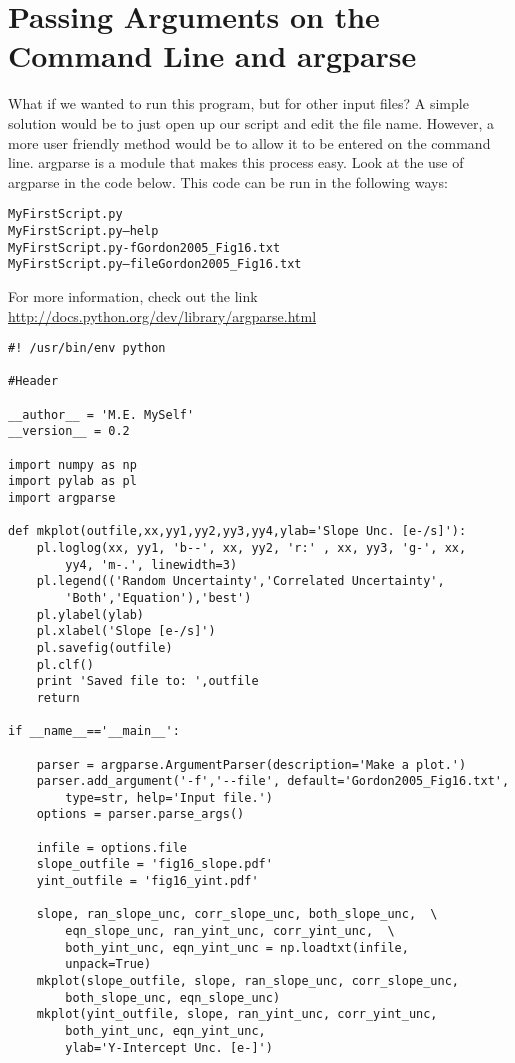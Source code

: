 \section{Passing Arguments on the Command Line and {\sf argparse}}
What if we wanted to run this program, but for other input files?  A
simple solution would be to just open up our script and edit the file
name.  However, a more user friendly method would be to allow it to be
entered on the command line.  {\sf\small argparse} is a module that
makes this process easy.  Look at the use of {\sf\small
  argparse} in the code below.  This code can be run in the following
ways:
\begin{alltt}
\termtab MyFirstScript.py 
\termtab MyFirstScript.py --help
\termtab MyFirstScript.py -f Gordon2005_Fig16.txt
\termtab MyFirstScript.py --file Gordon2005_Fig16.txt
\end{alltt}
For more information, check out the link
\url{http://docs.python.org/dev/library/argparse.html}

\begin{verbatim}
#! /usr/bin/env python

#Header

__author__ = 'M.E. MySelf'
__version__ = 0.2

import numpy as np
import pylab as pl
import argparse

def mkplot(outfile,xx,yy1,yy2,yy3,yy4,ylab='Slope Unc. [e-/s]'):
    pl.loglog(xx, yy1, 'b--', xx, yy2, 'r:' , xx, yy3, 'g-', xx,  
        yy4, 'm-.', linewidth=3) 
    pl.legend(('Random Uncertainty','Correlated Uncertainty',  
        'Both','Equation'),'best')
    pl.ylabel(ylab) 
    pl.xlabel('Slope [e-/s]') 
    pl.savefig(outfile) 
    pl.clf()
    print 'Saved file to: ',outfile 
    return  
    
if __name__=='__main__': 

    parser = argparse.ArgumentParser(description='Make a plot.')
    parser.add_argument('-f','--file', default='Gordon2005_Fig16.txt', 
        type=str, help='Input file.')
    options = parser.parse_args()

    infile = options.file 
    slope_outfile = 'fig16_slope.pdf'  
    yint_outfile = 'fig16_yint.pdf'  
    
    slope, ran_slope_unc, corr_slope_unc, both_slope_unc,  \
        eqn_slope_unc, ran_yint_unc, corr_yint_unc,  \
        both_yint_unc, eqn_yint_unc = np.loadtxt(infile, 
        unpack=True) 
    mkplot(slope_outfile, slope, ran_slope_unc, corr_slope_unc,  
        both_slope_unc, eqn_slope_unc) 
    mkplot(yint_outfile, slope, ran_yint_unc, corr_yint_unc,  
        both_yint_unc, eqn_yint_unc,
        ylab='Y-Intercept Unc. [e-]')
\end{verbatim}

